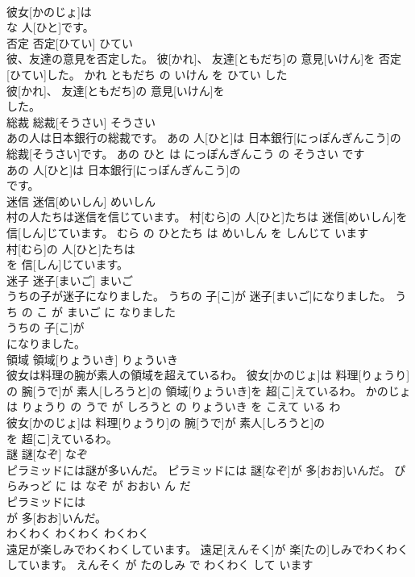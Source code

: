 \documentclass[8pt]{extreport}
\begin{document}
\begin{CJK}{UTF8}{min}
\\	彼女[かのじょ]は
\\	な 人[ひと]です。			
\\	否定	否定[ひてい]	ひてい	
\\	彼、友達の意見を否定した。	彼[かれ]、 友達[ともだち]の 意見[いけん]を 否定[ひてい]した。	かれ ともだち の いけん を ひてい した	
\\	彼[かれ]、 友達[ともだち]の 意見[いけん]を
\\	した。			
\\	総裁	総裁[そうさい]	そうさい	
\\	あの人は日本銀行の総裁です。	あの 人[ひと]は 日本銀行[にっぽんぎんこう]の 総裁[そうさい]です。	あの ひと は にっぽんぎんこう の そうさい です	
\\	あの 人[ひと]は 日本銀行[にっぽんぎんこう]の
\\	です。			
\\	迷信	迷信[めいしん]	めいしん	
\\	村の人たちは迷信を信じています。	村[むら]の 人[ひと]たちは 迷信[めいしん]を 信[しん]じています。	むら の ひとたち は めいしん を しんじて います	
\\	村[むら]の 人[ひと]たちは
\\	を 信[しん]じています。			
\\	迷子	迷子[まいご]	まいご	
\\	うちの子が迷子になりました。	うちの 子[こ]が 迷子[まいご]になりました。	うち の こ が まいご に なりました	
\\	うちの 子[こ]が
\\	になりました。			
\\	領域	領域[りょういき]	りょういき	
\\	彼女は料理の腕が素人の領域を超えているわ。	彼女[かのじょ]は 料理[りょうり]の 腕[うで]が 素人[しろうと]の 領域[りょういき]を 超[こ]えているわ。	かのじょ は りょうり の うで が しろうと の りょういき を こえて いる わ	
\\	彼女[かのじょ]は 料理[りょうり]の 腕[うで]が 素人[しろうと]の
\\	を 超[こ]えているわ。			
\\	謎	謎[なぞ]	なぞ	
\\	ピラミッドには謎が多いんだ。	ピラミッドには 謎[なぞ]が 多[おお]いんだ。	ぴらみっど に は なぞ が おおい ん だ	
\\	ピラミッドには
\\	が 多[おお]いんだ。			
\\	わくわく	わくわく	わくわく	
\\	遠足が楽しみでわくわくしています。	遠足[えんそく]が 楽[たの]しみでわくわくしています。	えんそく が たのしみ で わくわく して います	

\end{CJK}
\end{document}
